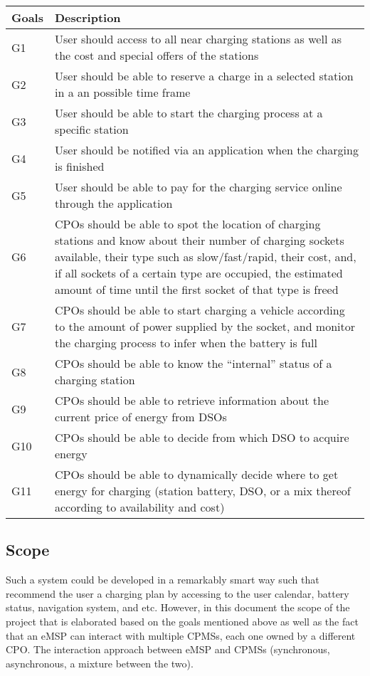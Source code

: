\documentclass{article}
\begin{document}
\begin{tabularx}{1\textwidth} { 
  | >{\raggedright\arraybackslash}X 
  | >{\raggedright\arraybackslash}X
  | }


\hline
\textbf {Goals} & \textbf{ Description} \\ 
 \hline
G1  &   User should access to all near charging stations as well as the cost and special offers of the stations \\
\hline
G2  &   User should be able to reserve a charge in a selected station in a an possible time frame\\
\hline
G3 &   User should be able to start the charging process at a specific station \\
\hline
G4 & User should be notified via an application when the charging is finished \\
\hline
G5 & User should be able to pay for the charging service online through the application \\
\hline
G6 & CPOs should be able to spot the location of charging stations and know about their number of charging sockets
available, their type such as slow/fast/rapid, their cost, and, if all sockets of a certain type are occupied, the estimated amount of time until the first socket of that type is freed \\
\hline
G7 & CPOs should be able to start charging a vehicle according to the amount of power supplied by the socket, and monitor the charging process to infer when the battery is full\\
\hline

G8 & CPOs should be able to know the “internal” status of a charging station \\
\hline

G9 & CPOs should be able to retrieve information about the current price of energy from DSOs\\
\hline

G10 & CPOs should be able to decide from which DSO to acquire energy\\
\hline

G11 & CPOs should be able to dynamically decide where to get energy for charging (station battery, DSO, or a mix thereof according to availability and cost)\\

\hline
\end{tabularx}

\subsection{Scope}
Such a system could be developed in a remarkably smart way such that recommend the user a charging plan by accessing to the user calendar, battery status, navigation system, and etc. However, in this document the scope of the project that is elaborated based on the goals mentioned above as well as the fact that an eMSP can interact with multiple CPMSs, each one owned by a different CPO. The interaction approach between eMSP and CPMSs (synchronous, asynchronous, a mixture between the two).
\end{document}

